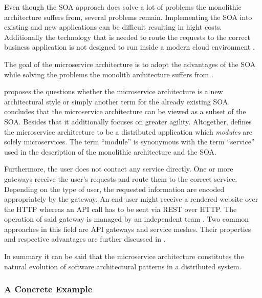 Even though the \ac{SOA} approach does solve a lot of problems the monolithic
architecture suffers from, several problems remain. Implementing the \ac{SOA}
into existing and new applications can be difficult resulting in hight costs.
Additionally the technology that is needed to route the requests to the correct
business application is not designed to run inside a modern cloud environment
\autocite[p. 584]{VillamizarEvaluatingmonolithicmicroservice2015}.

The goal of the microservice architecture is to adopt the advantages of the
\ac{SOA} while solving the problems the monolith architecture suffers from
\autocite[p. 584]{VillamizarEvaluatingmonolithicmicroservice2015}.

\autocite{VillamizarEvaluatingmonolithicmicroservice2015} proposes the
questions whether the microservice architecture is a new architectural style or
simply another term for the already existing \ac{SOA}.
\autocite{VillamizarEvaluatingmonolithicmicroservice2015} concludes that the
microservice architecture can be viewed as a subset of the \ac{SOA}. Besides
that it additionally focuses on greater agility. Altogether,
\autocite{DragoniMicroservicesyesterdaytoday2016} defines the microservice
architecture to be a distributed application which \textit{modules} are solely
microservices. The term \enquote{module} is synonymous with the term
\enquote{service} used in the description of the monolithic architecture and
the \ac{SOA}.

Furthermore, the user does not contact any service directly. One or more
gateways receive the user's requests and route them to the correct service.
Depending on the type of user, the requested information are encoded
appropriately by the gateway. An end user might receive a rendered website over
the \ac{HTTP} whereas an \ac{API} call has to be sent via \ac{REST} over
\ac{HTTP}. The operation of said gateway is managed by an independent team
\autocite[p. 585]{VillamizarEvaluatingmonolithicmicroservice2015}. Two common
approaches in this field are \ac{API} gateways and service meshes. Their
properties and respective advantages are further discussed in
\autocite{HariharaSubramanianHandsRESTfulAPI2019}.

In summary it can be said that the microservice architecture constitutes the
natural evolution of software architectural patterns in a distributed system.

\subsubsection{A Concrete Example}%
\label{ssub:A_Practical_Example}

